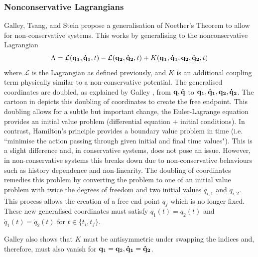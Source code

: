 \documentclass[10pt]{iopart}
\begin{document}
\subsubsection{Nonconservative Lagrangians \\}
Galley, Tsang, and Stein \cite{GalleyEtAl} propose a generalisation of Noether's Theorem to allow for non-conservative systems. This works by generalising to the nonconservative Lagrangian 
\begin{equation}
\label{non-con-lagran}
	\Lambda = \mathcal{L}(\bold{q_1,\dot q_1},t) - \mathcal{L}(\bold{q_2,\dot q_2},t) + K(\bold{q_1,\dot q_1,q_2,\dot q_2},t)
\end{equation}
where $\mathcal{L}$ is the Lagrangian as defined previously, and $K$ is an additional coupling term physically similar to a non-conservative potential. The generalised coordinates are doubled, as explained by Galley \cite{Galley}, from $\bold{q,\dot q}$ to $\bold{q_1,\dot q_1, q_2, \dot q_2}$. The cartoon in  depicts this doubling of coordinates to create the free endpoint. This doubling allows for a subtle but important change, the Euler-Lagrange equation provides an initial value problem (differential equation + initial conditions). In contrast, Hamilton's principle provides a boundary value problem in time (i.e. ``minimise the action passing through given initial and final time values"). This is a slight difference and, in conservative systems, does not pose an issue. However, in non-conservative systems this breaks down due to non-conservative behaviours such as history dependence and non-linearity. The doubling of coordinates remedies this problem by converting the problem to one of an initial value problem with twice the degrees of freedom and two initial values $q_{i,1}$ and $q_{i,2}$. This process allows the creation of a free end point $q_f$ which is no longer fixed. These new generalised coordinates must satisfy $q_1(t) = q_2(t)$ and $\dot q_1(t) = \dot q_2(t)$ for $t \in \{t_i, t_f\}$. 

Galley \cite{Galley} also shows that $K$ must be antisymmetric under swapping the indices and, therefore, must also vanish for $\bold q_1 =\bold q_2,\bold{\dot q_1} =\bold{\dot q_2}$.
\end{document}
